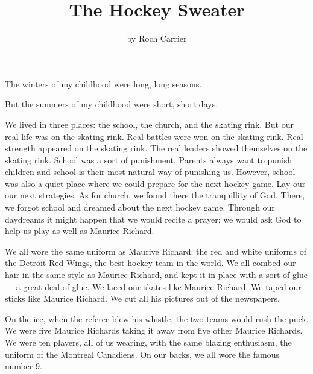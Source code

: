 \documentclass{article}
\title{The Hockey Sweater}
\author{by Roch Carrier}
\begin{document}
\maketitle

The winters of my childhood were long, long seasons.

But the summers of my childhood were short, short days.

We lived in three places: the school, the church, and the skating rink.
But our real life was on the skating rink. 
Real battles were won on the skating rink.
Real strength appeared on the skating rink.
The real leaders showed themselves on the skating rink.
School was a sort of punishment.
Parents always want to punish children and school is their most natural way of punishing us.
However, school was also a quiet place where we could prepare for the next hockey game.
Lay our our next strategies.
As for church, we found there the tranquillity of God.
There, we forgot school and dreamed about the next hockey game.
Through our daydreams it might happen that we would recite a prayer;
we would ask God to help us play as well as Maurice Richard.

We all wore the same uniform as Maurive Richard: 
the red and white uniforms of the Detroit Red Wings, the best hockey team in the world.
We all combed our hair in the same style as Maurice Richard, 
and kept it in place with a sort of glue --- a great deal of glue.
We laced our skates like Maurice Richard.
We taped our sticks like Maurice Richard.
We cut all his pictures out of the newspapers.

On the ice, when the referee blew his whistle, the two teams would rush the puck.
We were five Maurice Richards taking it away from five other Maurice Richards.
We were ten players, all of us wearing, with the same blazing enthusiasm, the uniform of the Montreal Canadiens.
On our backs, we all wore the famous number 9.
\end{document}
